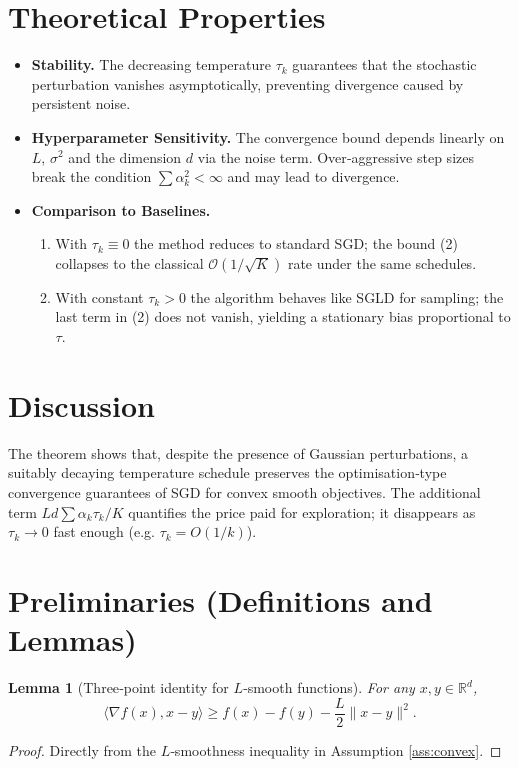 \documentclass{article}
\newtheorem{lemma}{Lemma}
\newcommand{\R}{\mathbb{R}}
\begin{document}
\section*{Theoretical Properties}
\begin{itemize}[nosep]
\item \textbf{Stability.} The decreasing temperature $\tau_{k}$ guarantees that the stochastic perturbation vanishes asymptotically, preventing divergence caused by persistent noise.
\item \textbf{Hyperparameter Sensitivity.} The convergence bound depends linearly on $L$, $\sigma^{2}$ and the dimension $d$ via the noise term. Over‑aggressive step sizes break the condition $\sum\alpha_{k}^{2}<\infty$ and may lead to divergence.
\item \textbf{Comparison to Baselines.}
    \begin{enumerate}[nosep]
        \item With $\tau_{k}\equiv0$ the method reduces to standard SGD; the bound (2) collapses to the classical $\mathcal O(1/\sqrt{K})$ rate under the same schedules.
        \item With constant $\tau_{k}>0$ the algorithm behaves like SGLD for sampling; the last term in (2) does not vanish, yielding a stationary bias proportional to $\tau$.
    \end{enumerate}
\end{itemize}

\section*{Discussion}
The theorem shows that, despite the presence of Gaussian perturbations, a suitably decaying temperature schedule preserves the optimisation‑type convergence guarantees of SGD for convex smooth objectives. The additional term $L d\sum\alpha_{k}\tau_{k}/K$ quantifies the price paid for exploration; it disappears as $\tau_{k}\to0$ fast enough (e.g. $\tau_{k}=O(1/k)$).

\newpage
\section*{Preliminaries (Definitions and Lemmas)}
\begin{lemma}[Three‑point identity for $L$‑smooth functions]\label{lem:3pt}
For any $x,y\in\R^{d}$,
\[
\langle\nabla f(x),x-y\rangle\ge f(x)-f(y)-\frac{L}{2}\|x-y\|^{2}.
\]
\end{lemma}
\begin{proof}
Directly from the $L$‑smoothness inequality in Assumption \ref{ass:convex}. \hfill\qedsymbol
\end{proof}
\end{document}
